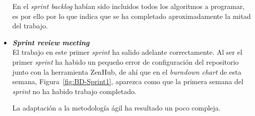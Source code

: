 \begin{itemize}
En el \textit{sprint backlog} habían sido incluidos todos los algoritmos a programar, es por ello por lo que indica que se ha completado aproximadamente la mitad del trabajo.

\item \textbf{\textit{Sprint review meeting}}\\
El trabajo en este primer \textit{sprint} ha salido adelante correctamente. Al ser el primer \textit{sprint} ha habido un pequeño error de configuración del repositorio junto con la herramienta ZenHub, de ahí que en el \textit{burndown chart} de esta semana, Figura~\ref{fig:BD-Sprint1}, aparezca como que la primera semana del \textit{sprint} no ha habido trabajo completado.

La adaptación a la metodología ágil ha resultado un poco compleja.
\end{itemize}

